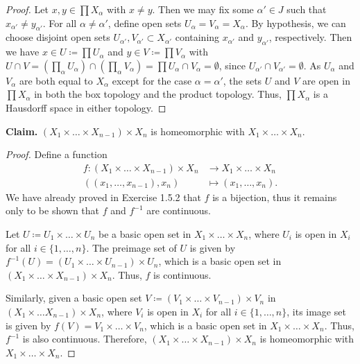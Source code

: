 \begin{solution}
    \begin{proof}
        Let $x, y \in \prod X_\alpha$ with $x \neq y$.
        Then we may fix some $\alpha' \in J$ such that $x_{\alpha'} \neq y_{\alpha'}$.
        For all $\alpha \neq \alpha'$, define open sets $U_\alpha = V_\alpha = X_\alpha$.
        By hypothesis, we can choose disjoint open sets $U_{\alpha'}, V_{\alpha'} \subset X_{\alpha'}$ containing $x_{\alpha'}$ and $y_{\alpha'}$, respectively.
        Then we have $x \in U \coloneq \prod U_\alpha$ and $y \in V \coloneq \prod V_\alpha$ with $U \cap V = \left(\prod_\alpha U_\alpha\right) \cap \left(\prod_\alpha V_\alpha\right) = \prod U_\alpha \cap V_\alpha = \emptyset$, since $U_{\alpha'} \cap V_{\alpha'} = \emptyset$.
        As $U_\alpha$ and $V_\alpha$ are both equal to $X_\alpha$ except for the case $\alpha = \alpha'$, the sets $U$ and $V$ are open in $\prod X_\alpha$ in both the box topology and the product topology.
        Thus, $\prod X_\alpha$ is a Hausdorff space in either topology.
    \end{proof}
\end{solution}
\newpage

\begin{exercise}[ID=2.19.4]
    {\bf Claim.} $(X_1 \times \ldots \times X_{n-1}) \times X_n$ is homeomorphic with $X_1 \times \ldots \times X_n$.
\end{exercise}

\begin{solution}
    \begin{proof}
        Define a function
        \begin{align*}
            f: (X_1 \times \ldots \times X_{n-1}) \times X_n & \rightarrow X_1 \times \ldots \times X_n \\
            ((x_1, \ldots, x_{n-1}), x_n)                    & \mapsto (x_1, \ldots, x_n).
        \end{align*}
        We have already proved in Exercise 1.5.2 that $f$ is a bijection, thus it remains only to be shown that $f$ and $f^{-1}$ are continuous.

        Let $U \coloneq U_1 \times \ldots \times U_n$ be a basic open set in $X_1 \times \ldots \times X_n$, where $U_i$ is open in $X_i$ for all $i \in \{1, \ldots, n\}$.
        The preimage set of $U$ is given by $f^{-1}(U) = (U_1 \times \ldots \times U_{n-1}) \times U_n$, which is a basic open set in $(X_1 \times \ldots \times X_{n-1}) \times X_n$.
        Thus, $f$ is continuous.

        Similarly, given a basic open set $V \coloneq (V_1 \times \ldots \times V_{n-1}) \times V_n$ in $(X_1 \times \ldots X_{n-1}) \times X_n$, where $V_i$ is open in $X_i$ for all $i \in \{1, \ldots, n\}$, its image set is given by $f(V) = V_1 \times \ldots \times V_n$, which is a basic open set in $X_1 \times \ldots \times X_n$.
        Thus, $f^{-1}$ is also continuous.
        Therefore, $(X_1 \times \ldots \times X_{n-1}) \times X_n$ is homeomorphic with $X_1 \times \ldots \times X_n$.
    \end{proof}
\end{solution}
\newpage

